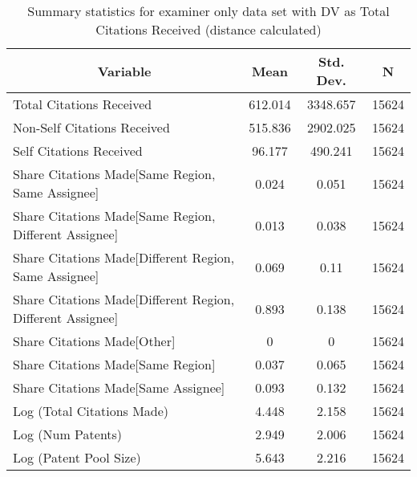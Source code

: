 
\begin{table}[htbp]\centering \caption{Summary statistics for examiner only data set with DV as Total Citations Received (distance calculated) \label{e.tsummary}}
\begin{tabular}{l c c  c}\hline\hline
\multicolumn{1}{c}{\textbf{Variable}} & \textbf{Mean}
 & \textbf{Std. Dev.} & \textbf{N}\\ \hline
Total Citations Received & 612.014 & 3348.657  & 15624\\
Non-Self Citations Received & 515.836 & 2902.025  & 15624\\
Self Citations Received & 96.177 & 490.241  & 15624\\
Share Citations Made[Same Region, Same Assignee] & 0.024 & 0.051  & 15624\\
Share Citations Made[Same Region, Different Assignee] & 0.013 & 0.038  & 15624\\
Share Citations Made[Different Region, Same Assignee] & 0.069 & 0.11  & 15624\\
Share Citations Made[Different Region, Different Assignee] & 0.893 & 0.138  & 15624\\
Share Citations Made[Other] & 0 & 0  & 15624\\
Share Citations Made[Same Region] & 0.037 & 0.065  & 15624\\
Share Citations Made[Same Assignee] & 0.093 & 0.132  & 15624\\
Log (Total Citations Made) & 4.448 & 2.158  & 15624\\
Log (Num Patents) & 2.949 & 2.006  & 15624\\
Log (Patent Pool Size) & 5.643 & 2.216  & 15624\\
\hline\end{tabular}
\end{table}
